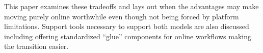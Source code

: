 This paper examines these tradeoffs and lays out when the advantages may make
moving purely online worthwhile even though not being forced by platform
limitations. Support tools necessary to support both models are also discussed
including offering standardized ``glue'' components for online workflows making
the transition easier.
\fi
